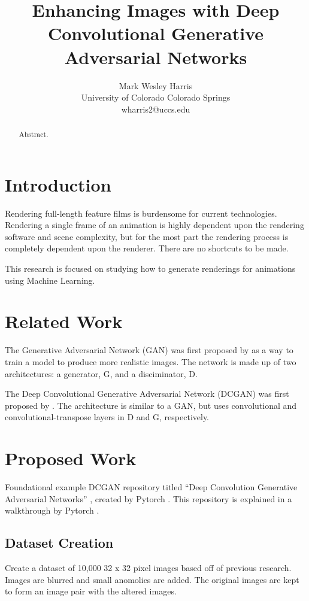 \documentclass[letterpaper]{article} %
\title{Enhancing Images with Deep Convolutional Generative Adversarial Networks}
\author{Mark Wesley Harris\\ %
University of Colorado Colorado Springs\\
wharris2@uccs.edu %
}
\begin{document}
\maketitle

\begin{abstract}
Abstract.
\end{abstract}

\section{Introduction}
\label{sec:introduction}
Rendering full-length feature films is burdensome for current technologies.
Rendering a single frame of an animation is highly dependent upon the rendering software
and scene complexity,
but for the most part the rendering process is completely dependent upon the renderer.
There are no shortcuts to be made.

This research is focused on studying how to generate renderings for animations using
Machine Learning.

\section{Related Work}
\label{sec:related_work}
The Generative Adversarial Network (GAN) was first proposed by
\cite{generative_adversarial_networks}
as a way to
train a model to produce more realistic images. The network is made up of two architectures:
a generator, G, and a disciminator, D.

The Deep Convolutional Generative Adversarial Network (DCGAN) was first proposed by
\cite{unsupervised_learning}. The architecture is similar to a GAN,
but uses convolutional and convolutional-transpose layers in D and G, respectively.

\section{Proposed Work}
\label{sec:proposed_work}
Foundational example DCGAN repository titled ``Deep Convolution Generative Adversarial Networks''
, created by Pytorch \cite{dcgan_git}. This repository is explained in a walkthrough
by Pytorch \cite{dcgan_example}.

\subsection{Dataset Creation}
\label{subsec:data}
Create a dataset of 10,000 32 x 32 pixel images based off of previous research.
Images are blurred and small anomolies are added.
The original images are kept to form an image pair with the altered images.
\end{document}
